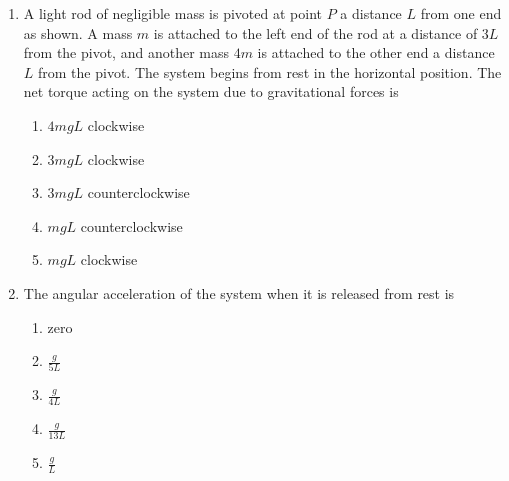 \documentclass{../../../oss-apphys}
\begin{document}
\begin{multicols*}{2}
\begin{enumerate}[leftmargin=18pt]
  \item A light rod of negligible mass is pivoted at point $P$ a distance $L$
    from one end as shown. A mass $m$ is attached to the left end of the rod at
    a distance of $3L$ from the pivot, and another mass $4m$ is attached to the
    other end a distance $L$ from the pivot. The system begins from rest in the
    horizontal position. The net torque acting on the system due to
    gravitational forces is
    \begin{center}
      \vspace{-.15in}
    \end{center}
    \begin{enumerate}[nosep,leftmargin=18pt,label=(\Alph*)]
    \item $4mgL$ clockwise
    \item $3mgL$ clockwise
    \item $3mgL$ counterclockwise
    \item $mgL$ counterclockwise
    \item $mgL$ clockwise
    \end{enumerate}
    
  \item The angular acceleration of the system when it is released from rest is
    \begin{enumerate}[itemsep=4pt,topsep=0pt,leftmargin=18pt,label=(\Alph*)]
    \item zero
    \item $\displaystyle\frac{g}{5L}$
    \item $\displaystyle\frac{g}{4L}$
    \item $\displaystyle\frac{g}{13L}$
    \item $\displaystyle\frac{g}L$
    \end{enumerate}
    

\end{enumerate}
\end{multicols*}
\end{document}
